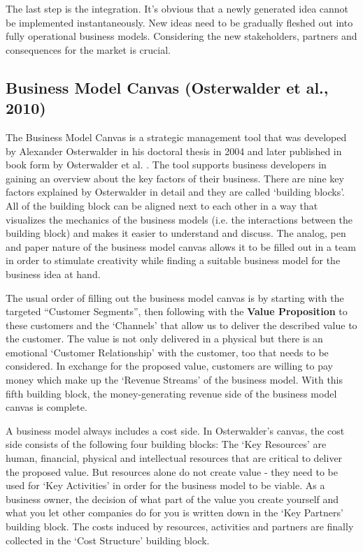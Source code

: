 		The last step is the integration. It's obvious that a newly generated idea cannot be implemented instantaneously. New ideas need to be gradually fleshed out into fully operational business models. Considering the new stakeholders, partners and consequences for the market is crucial.

	\subsection{Business Model Canvas (Osterwalder et al., 2010)} 
		The Business Model Canvas is a strategic management tool that was developed by Alexander Osterwalder in his doctoral thesis in 2004 and later published in book form by Osterwalder et al. \cite{osterwalder}. The tool supports business developers in gaining an overview about the key factors of their business. There are nine key factors explained by Osterwalder in detail and they are called `building blocks'. All of the building block can be aligned next to each other in a way that visualizes the mechanics of the business models (i.e. the interactions between the building block) and makes it easier to understand and discuss. The analog, pen and paper nature of the business model canvas allows it to be filled out in a team in order to stimulate creativity while finding a suitable business model for the business idea at hand.

		The usual order of filling out the business model canvas \cite{bmc} is by starting with the targeted ``Customer Segments'', then following with the \textbf{Value Proposition} to these customers and the `Channels' that allow us to deliver the described value to the customer. The value is not only delivered in a physical but there is an emotional `Customer Relationship' with the customer, too that needs to be considered. In exchange for the proposed value, customers are willing to pay money which make up the `Revenue Streams' of the business model. With this fifth building block, the money-generating revenue side of the business model canvas is complete.

		A business model always includes a cost side. In Osterwalder's canvas, the cost side consists of the following four building blocks: The `Key Resources' are human, financial, physical and intellectual resources that are critical to deliver the proposed value. But resources alone do not create value - they need to be used for `Key Activities' in order for the business model to be viable. As a business owner, the decision of what part of the value you create yourself and what you let other companies do for you is written down in the `Key Partners' building block. The costs induced by resources, activities and partners are finally collected in the `Cost Structure' building block.

